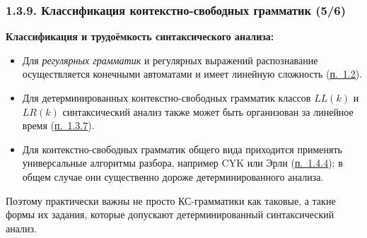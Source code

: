 \documentclass[mathserif,12pt,aspectratio=169]{beamer}
\renewcommand{\index}[1]{}
\def\NB#1{{\bf\color{brown}#1}}
\def\odmkey#1#2{{\it\color{red} #1}\index{#2}}
\def\DMref#1#2{{\color{blue}\underline{\hyperlink{#2}{#1}}}}
\begin{document}
\begin{frame}
\frametitle{1.3.9. Классификация контекстно-свободных грамматик (5/6)}

\NB{Классификация и трудоёмкость синтаксического анализа:}

\begin{itemize}
\item Для \odmkey{регулярных грамматик}{Грамматика!регулярная}
и регулярных выражений распознавание осуществляется
конечными автоматами и имеет линейную сложность
(\DMref{п.~1.2}{1.2.}).

\item Для детерминированных контекстно-свободных грамматик
классов \odmkey{$LL(k)$}{LL(k)!Грамматика}
и \odmkey{$LR(k)$}{LR(k)!Грамматика}
синтаксический анализ также может быть организован
за линейное время
(\DMref{п.~1.3.7}{1.3.7.}).

\item Для контекстно-свободных грамматик общего вида
приходится применять универсальные алгоритмы разбора,
например CYK или Эрли
(\DMref{п.~1.4.4}{1.4.4.});
в общем случае они существенно дороже детерминированного анализа.
\end{itemize}

\begin{remark}
Поэтому практически важны не просто КС-грамматики как таковые,
а такие формы их задания,
которые допускают детерминированный синтаксический анализ.
\end{remark}

\end{frame}
\end{document}
